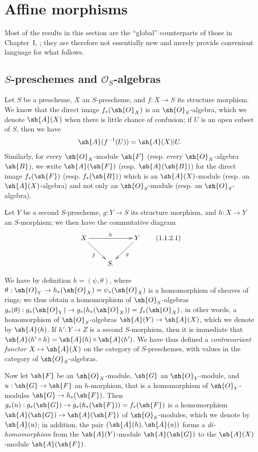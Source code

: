 \section{Affine morphisms}
\label{section:II.1}

Most of the results in this section are the ``global'' counterparts of those
in Chapter~I, ; they are therefore not essentially new and
merely provide convenient language for what follows.
\bigskip

\subsection{$S$-preschemes and $\mathcal{O}_S$-algebras}
\label{subsection:II.1.1}

\begin{env}[1.1.1]
\label{II.1.1.1}
Let $S$ be a prescheme, $X$ an $S$-prescheme, and $f:X\to S$ its structure morphism.
We know  that the direct image $f_*(\sh{O}_X)$ is an $\sh{O}_S$-algebra, which we
denote $\sh{A}(X)$ when there is little chance of confusion; if $U$ is an open subset of $S$, then we have
\[
  \sh{A}(f^{-1}(U))=\sh{A}(X)|U.
\]
Similarly, for every $\sh{O}_X$-module $\sh{F}$ (resp. every $\sh{O}_X$-algebra $\sh{B}$), we write $\sh{A}(\sh{F})$ (resp. $\sh{A}(\sh{B})$) for the direct image $f_*(\sh{F})$ (resp. $f_*(\sh{B})$) which is an $\sh{A}(X)$-module (resp. an $\sh{A}(X)$-algebra) and not only an $\sh{O}_S$-module (resp. an $\sh{O}_S$-algebra).
\end{env}

\begin{env}[1.1.2]
\label{II.1.1.2}
Let $Y$ be a second $S$-prescheme, $g:Y\to S$ its structure morphism, and $h:X\to Y$ an $S$-morphism; we then have the commutative diagram
\[
\label{II.1.1.2.1}
  \xymatrix{
    X\ar[rr]^h\ar[rd]_f & &
    Y\ar[ld]^g\\
    & S.
  }
  \tag{1.1.2.1}
\]

We have by definition $h=(\psi,\theta)$, where $\theta:\sh{O}_Y\to h_*(\sh{O}_X)=\psi_*(\sh{O}_X)$ is a homomorphism of sheaves of rings; we thus obtain  a homomorphism of $\sh{O}_S$-algebras $g_*(\theta):g_*(\sh{O}_Y)\to g_*(h_*(\sh{O}_X))=f_*(\sh{O}_X)$, in other words, a homomorphism of $\sh{O}_S$-algebras $\sh{A}(Y)\to\sh{A}(X)$, which we denote by $\sh{A}(h)$.
If $h':Y\to Z$ is a second $S$-morphism, then it is immediate that $\sh{A}(h'\circ h)=\sh{A}(h)\circ\sh{A}(h')$.
We have thus defined a \emph{contravariant functor $X\mapsto\sh{A}(X)$} on the category of $S$-preschemes, with values in the category of $\sh{O}_S$-algebras.

Now let $\sh{F}$ be an $\sh{O}_X$-module, $\sh{G}$ an $\sh{O}_Y$-module, and $u:\sh{G}\to\sh{F}$ an $h$-morphism, that is  a homomorphism of $\sh{O}_Y$-modules $\sh{G}\to h_*(\sh{F})$.
Then $g_*(u):g_*(\sh{G})\to g_*(h_*(\sh{F}))=f_*(\sh{F})$ is a homomorphism $\sh{A}(\sh{G})\to\sh{A}(\sh{F})$ of $\sh{O}_S$-modules, which we denote by $\sh{A}(u)$; in addition, the pair $(\sh{A}(h),\sh{A}(u))$ forms a \emph{di-homomorphism} from the $\sh{A}(Y)$-module $\sh{A}(\sh{G})$ to the $\sh{A}(X)$-module $\sh{A}(\sh{F})$.
\end{env}

